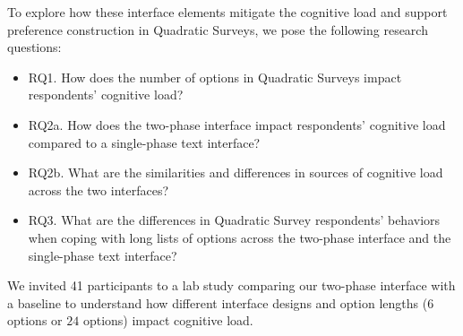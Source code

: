 To explore how these interface elements mitigate the cognitive load and support preference construction in Quadratic Surveys, we pose the following research questions:
\begin{itemize}
    \item RQ1. How does the number of options in Quadratic Surveys impact respondents' cognitive load?
    \item RQ2a. How does the two-phase interface impact respondents' cognitive load compared to a single-phase text interface?
    \item RQ2b. What are the similarities and differences in sources of cognitive load across the two interfaces?
    \item RQ3. What are the differences in Quadratic Survey respondents' behaviors when coping with long lists of options across the two-phase interface and the single-phase text interface?
\end{itemize}

We invited 41 participants to a lab study comparing our two-phase interface with a baseline to understand how different interface designs and option lengths ($6$ options or $24$ options) impact cognitive load. 




